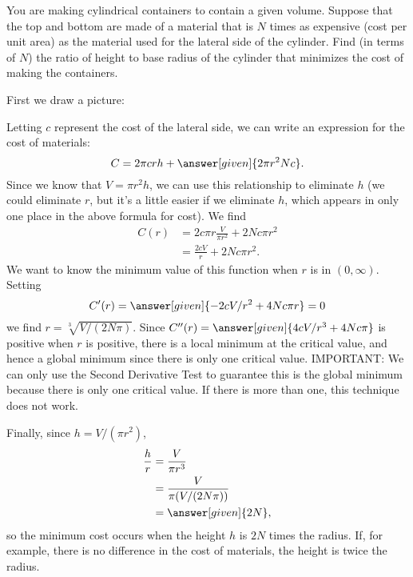 \documentclass{ximera}
\begin{document}
\begin{example}
You are making cylindrical containers to contain a given volume.  Suppose
that the top and bottom are made of a material that is $N$ times as
expensive (cost per unit area) as the material used for the lateral side of
the cylinder.  Find (in terms of $N$) the ratio of height to base radius of
the cylinder that minimizes the cost of making the containers.
\begin{explanation}
  First we draw a picture:
\begin{image}
\end{image}
  Letting $c$ represent the cost of the lateral side, we can write an
  expression for the cost of materials:
  \[
  C = 2\pi crh+\answer[given]{2\pi r^2Nc}.
  \]
  Since we know that $V=\pi r^2h$, we can use this relationship to
  eliminate $h$ (we could eliminate $r$, but it's a little easier if we
  eliminate $h$, which appears in only one place in the above formula
  for cost).  We find
\begin{align*}
  C(r)&=2c\pi r\frac{V}{\pi r^2}+2Nc\pi r^2\\
  &=\frac{2cV}{r}+2Nc\pi r^2.
\end{align*}
We want to know the minimum value of this function when $r$ is in
$(0,\infty)$. Setting
\[
C'(r)=\answer[given]{-2cV/r^2+4Nc\pi r} =0
\]
we find $r=\sqrt[3]{V/(2N\pi)}$.  Since $C''(r)=\answer[given]{4cV/r^3+4Nc\pi}$ is
positive when $r$ is positive, there is a local minimum at the
critical value, and hence a global minimum since there is only one
critical value. IMPORTANT: We can only use the Second Derivative Test to guarantee this is the global minimum because there is only one critical value. If there is more than one, this technique does not work.

Finally, since $h=V/(\pi r^2)$, 
\begin{align*}
\frac{h}{r}&=\frac{V}{\pi r^3}\\ 
&=\frac{V}{\pi(V/(2N\pi))}\\ 
&=\answer[given]{2N},
\end{align*}
so the minimum cost occurs when the height $h$ is $2N$ times the
radius. If, for example, there is no difference in the cost of
materials, the height is twice the radius.
\end{explanation}
\end{example}
\end{document}
